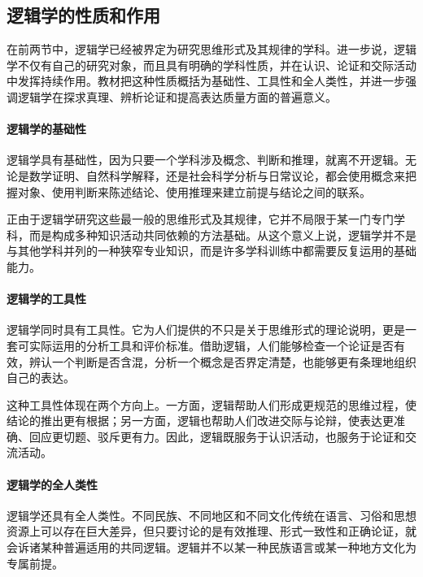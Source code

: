 \subsection{逻辑学的性质和作用}

在前两节中，逻辑学已经被界定为研究思维形式及其规律的学科。进一步说，逻辑学不仅有自己的研究对象，而且具有明确的学科性质，并在认识、论证和交际活动中发挥持续作用。教材把这种性质概括为基础性、工具性和全人类性，并进一步强调逻辑学在探求真理、辨析论证和提高表达质量方面的普遍意义。

\paragraph{逻辑学的基础性}\label{logic.foundational_character_of_logic}

逻辑学具有基础性，因为只要一个学科涉及概念、判断和推理，就离不开逻辑。无论是数学证明、自然科学解释，还是社会科学分析与日常议论，都会使用概念来把握对象、使用判断来陈述结论、使用推理来建立前提与结论之间的联系。

正由于逻辑学研究这些最一般的思维形式及其规律，它并不局限于某一门专门学科，而是构成多种知识活动共同依赖的方法基础。从这个意义上说，逻辑学并不是与其他学科并列的一种狭窄专业知识，而是许多学科训练中都需要反复运用的基础能力。

\paragraph{逻辑学的工具性}\label{logic.instrumental_character_of_logic}

逻辑学同时具有工具性。它为人们提供的不只是关于思维形式的理论说明，更是一套可实际运用的分析工具和评价标准。借助逻辑，人们能够检查一个论证是否有效，辨认一个判断是否含混，分析一个概念是否界定清楚，也能够更有条理地组织自己的表达。

这种工具性体现在两个方向上。一方面，逻辑帮助人们形成更规范的思维过程，使结论的推出更有根据；另一方面，逻辑也帮助人们改进交际与论辩，使表达更准确、回应更切题、驳斥更有力。因此，逻辑既服务于认识活动，也服务于论证和交流活动。

\paragraph{逻辑学的全人类性}\label{logic.universality_of_logic}

逻辑学还具有全人类性。不同民族、不同地区和不同文化传统在语言、习俗和思想资源上可以存在巨大差异，但只要讨论的是有效推理、形式一致性和正确论证，就会诉诸某种普遍适用的共同逻辑。逻辑并不以某一种民族语言或某一种地方文化为专属前提。

